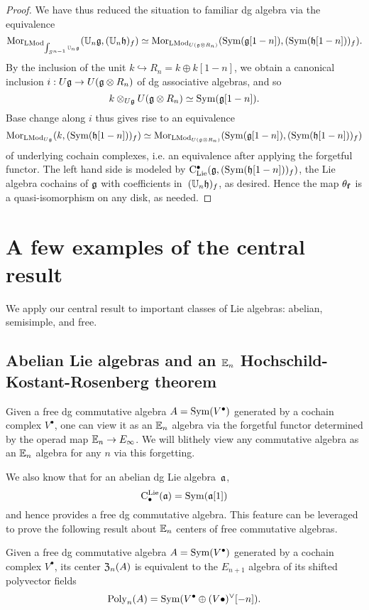 \documentclass[11pt]{amsart}
\numberwithin{equation}{section}
\begin{document}
\begin{proof}
We have thus reduced the situation to familiar dg algebra via the equivalence
\[
{\rm Mor}_{{\rm LMod}_{\int_{S^{n-1}} \mathbb U_n\mathfrak g}}(\mathbb U_n \mathfrak g, (\mathbb U_n \mathfrak h)_f) 
\simeq 
{\rm Mor}_{{\rm LMod}_{U(\mathfrak g \otimes R_n)}} ({\rm Sym}(\mathfrak g[1-n]), ({\rm Sym}(\mathfrak h[1-n]))_f).
\]
By the inclusion of the unit $k \hookrightarrow R_n = k \oplus k[1-n]$,
we obtain a canonical inclusion $i: U\mathfrak g \to U(\mathfrak g \otimes R_n)$ of dg associative algebras,
and so
\[
k \otimes_{U\mathfrak g} U(\mathfrak g \otimes R_n) \simeq {\rm Sym}(\mathfrak g[1-n]).
\]
Base change along $i$ thus gives rise to an equivalence 
\[
{\rm Mor}_{{\rm LMod}_{U\mathfrak g}} (k, ({\rm Sym}(\mathfrak h[1-n]))_f) \simeq {\rm Mor}_{{\rm LMod}_{U(\mathfrak g \otimes R_n)}} ({\rm Sym}(\mathfrak g[1-n]), ({\rm Sym}(\mathfrak h[1-n]))_f)
\]
of underlying cochain complexes, i.e. an equivalence after applying the forgetful functor. 
The left hand side is modeled by ${\rm C}_{\rm Lie}^\bullet(\mathfrak g,({\rm Sym}(\mathfrak h[1-n]))_f)$, 
the Lie algebra cochains of $\mathfrak g$ with coefficients in~$(\mathbb U_n \mathfrak h)_f$, as desired.
Hence the map $\theta_{\bf f}$ is a quasi-isomorphism on any disk, as needed.
\end{proof}

\section{A few examples of the central result}

We apply our central result to important classes of Lie algebras: 
abelian, semisimple, and free.

\subsection{Abelian Lie algebras and an $\mathbb E_n$ Hochschild-Kostant-Rosenberg theorem}

Given a free dg commutative algebra $A = {\rm Sym}(V^\bullet)$ generated by a cochain complex $V^\bullet$,
one can view it as an $\mathbb E_n$ algebra via the forgetful functor determined by the operad map $\mathbb E_n \to E_\infty$.
We will blithely view any commutative algebra as an $\mathbb E_n$ algebra for any $n$ via this forgetting.

We also know that for an abelian dg Lie algebra~${\frak a}$, 
\[
{\rm C}^{\rm Lie}_\bullet({\frak a}) = {\rm Sym}({\frak a}[1])
\]
and hence provides a free dg commutative algebra.
This feature can be leveraged to prove the following result about $\mathbb E_n$ centers of free commutative algebras.

\begin{prp}
Given a free dg commutative algebra $A = {\rm Sym}(V^\bullet)$ generated by a cochain complex $V^\bullet$,
its center ${\frak Z}_n(A)$ is equivalent to the $E_{n+1}$ algebra of its shifted polyvector fields 
\[
{\rm Poly}_n(A) = {\rm Sym}(V^\bullet \oplus (V\bullet)^\vee[-n]).
\]
\end{prp}
\end{document}
